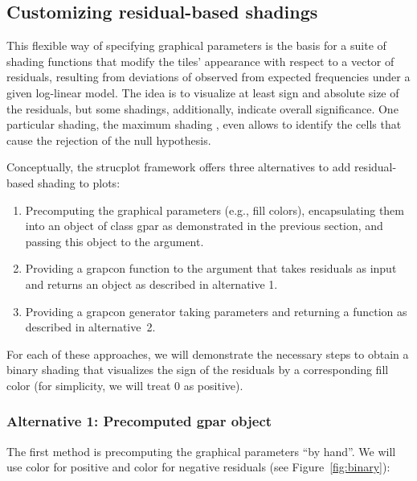 \documentclass{Z}
\newcommand{\class}[1]{\textsf{#1}}
\begin{document}
\subsection{Customizing residual-based shadings}
\label{sec:shadingcustom}

This flexible way of specifying graphical parameters is the basis for a suite of
shading functions that modify the tiles' appearance with respect to a vector of 
residuals, resulting from deviations of observed from expected
frequencies under a given log-linear model. 
The idea is to visualize at least sign and absolute size of the residuals, but some
shadings, additionally, indicate overall significance. One particular
shading, the maximum shading 
\citep{vcd:Meyer+Zeileis+Hornik:2003,vcd:Zeileis+Meyer+Hornik:2005},
even allows to identify the cells that cause the rejection of the null hypothesis.

Conceptually, the strucplot framework offers three alternatives to
add residual-based shading to plots:

\begin{enumerate}
\item Precomputing the graphical parameters (e.g., fill colors),
  encapsulating them into an object of class
  \class{gpar} as demonstrated in the previous section, and
  passing this object to the  argument.
\item Providing a grapcon function to the  argument that 
  takes residuals as input and returns an object as described in
  alternative 1.
 \item Providing a grapcon generator taking parameters and 
   returning a function as described in alternative~2.
\end{enumerate}

\noindent For each of these approaches, we will demonstrate the
necessary steps to obtain a binary shading that visualizes the sign of
the residuals by a corresponding 
fill color (for simplicity, we will treat 0 as positive).

\subsubsection*{Alternative 1: Precomputed \class{gpar} object}

The first method is precomputing the graphical parameters ``by
hand''. We will use  color for positive and 
color for negative residuals (see Figure~\ref{fig:binary}):
\end{document}
